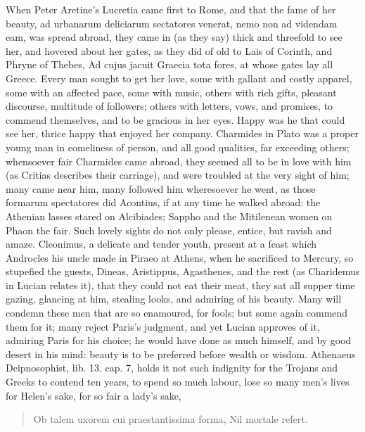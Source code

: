 When Peter Aretine's Lucretia came first to Rome, and that the
fame of her beauty, ad urbanarum deliciarum sectatores venerat, nemo
non ad videndam eam, \etc{} was spread abroad, they came in (as they say)
thick and threefold to see her, and hovered about her gates, as they
did of old to Lais of Corinth, and Phryne of Thebes, Ad cujus
jacuit Graecia tota fores, at whose gates lay all Greece. Every
man sought to get her love, some with gallant and costly apparel, some
with an affected pace, some with music, others with rich gifts,
pleasant discourse, multitude of followers; others with letters, vows,
and promises, to commend themselves, and to be gracious in her eyes.
Happy was he that could see her, thrice happy that enjoyed her company.
Charmides in Plato was a proper young man in comeliness of
person, and all good qualities, far exceeding others; whensoever fair
Charmides came abroad, they seemed all to be in love with him (as
Critias describes their carriage), and were troubled at the very sight
of him; many came near him, many followed him wheresoever he went, as
those formarum spectatores did Acontius, if at any time he walked
abroad: the Athenian lasses stared on Alcibiades; Sappho and the
Mitilenean women on Phaon the fair. Such lovely sights do not only
please, entice, but ravish and amaze. Cleonimus, a delicate and tender
youth, present at a feast which Androcles his uncle made in Piraeo at
Athens, when he sacrificed to Mercury, so stupefied the guests, Dineas,
Aristippus, Agasthenes, and the rest (as Charidemus in Lucian
relates it), that they could not eat their meat, they sat all supper
time gazing, glancing at him, stealing looks, and admiring of his
beauty. Many will condemn these men that are so enamoured, for fools;
but some again commend them for it; many reject Paris's judgment, and
yet Lucian approves of it, admiring Paris for his choice; he would have
done as much himself, and by good desert in his mind: beauty is to be
preferred before wealth or wisdom. Athenaeus Deipnosophist,
lib. 13. cap. 7, holds it not such indignity for the Trojans and Greeks
to contend ten years, to spend so much labour, lose so many men's lives
for Helen's sake, for so fair a lady's sake,

\begin{latin}
\begin{verse}%
Ob talem uxorem cui praestantissima forma,
Nil mortale refert.
\end{verse}%
\end{latin}

